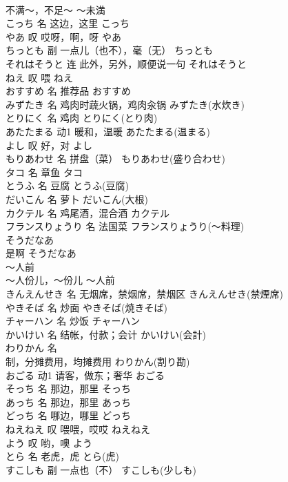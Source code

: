 \documentclass[8pt]{extreport}
\begin{document}
\begin{CJK}{UTF8}{min}
\\	不满～，不足～	～未満	
\\	こっち	名	这边，这里	こっち	
\\	やあ	叹	哎呀，啊，呀	やあ	
\\	ちっとも	副	一点儿（也不），毫（无）	ちっとも	
\\	それはそうと	连	此外，另外，顺便说一句	それはそうと	
\\	ねえ	叹	喂	ねえ	
\\	おすすめ	名	推荐品	おすすめ	
\\	みずたき	名	鸡肉时蔬火锅，鸡肉汆锅	みずたき(水炊き)	
\\	とりにく	名	鸡肉	とりにく(とり肉)	
\\	あたたまる	动1	暖和，温暖	あたたまる(温まる)	
\\	よし	叹	好，对	よし	
\\	もりあわせ	名	拼盘（菜）	もりあわせ(盛り合わせ)	
\\	タコ	名	章鱼	タコ	
\\	とうふ	名	豆腐	とうふ(豆腐)	
\\	だいこん	名	萝卜	だいこん(大根)	
\\	カクテル	名	鸡尾酒，混合酒	カクテル	
\\	フランスりょうり	名	法国菜	フランスりょうり(～料理)	
\\	そうだなあ	
\\	是啊	そうだなあ	
\\	～人前	
\\	～人份儿，～份儿	～人前	
\\	きんえんせき	名	无烟席，禁烟席，禁烟区	きんえんせき(禁煙席)	
\\	やきそば	名	炒面	やきそば(焼きそば)	
\\	チャーハン	名	炒饭	チャーハン	
\\	かいけい	名	结帐，付款；会计	かいけい(会計)	
\\	わりかん	名	
\\	制，分摊费用，均摊费用	わりかん(割り勘)	
\\	おごる	动1	请客，做东；奢华	おごる	
\\	そっち	名	那边，那里	そっち	
\\	あっち	名	那边，那里	あっち	
\\	どっち	名	哪边，哪里	どっち	
\\	ねえねえ	叹	喂喂，哎哎	ねえねえ	
\\	よう	叹	哟，噢	よう	
\\	とら	名	老虎，虎	とら(虎)	
\\	すこしも	副	一点也（不）	すこしも(少しも)	

\end{CJK}
\end{document}
